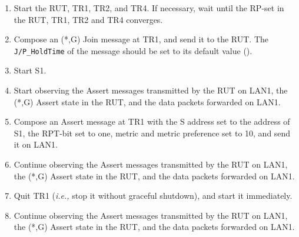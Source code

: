 \documentclass[11pt]{report}
\newcommand{\ie}{\emph{i.e.,}\xspace}
\begin{document}
\begin{enumerate}

  \item Start the RUT, TR1, TR2, and TR4. If necessary, wait until the RP-set
  in the RUT, TR1, TR2 and TR4 converges.

  \item Compose an (*,G) Join message at TR1, and send it to the RUT.
  The \verb=J/P_HoldTime= of the message should be set to its default
  value ({\PimsmJPHoldTime}).

  \item Start S1.

  \item Start observing the Assert messages transmitted by the RUT on
  LAN1, the (*,G) Assert state in the RUT, and the data packets forwarded on
  LAN1.

  \item Compose an Assert message at TR1 with the S address set to the
  address of S1, the RPT-bit set to one, metric and metric preference set to
  10, and send it on LAN1.

  \item Continue observing the Assert messages transmitted by the RUT on
  LAN1, the (*,G) Assert state in the RUT, and the data packets forwarded on
  LAN1.

  \item Quit TR1 (\ie stop it without graceful shutdown), and start it
  immediately.

  \item Continue observing the Assert messages transmitted by the RUT on
  LAN1, the (*,G) Assert state in the RUT, and the data packets forwarded on
  LAN1.

\end{enumerate}

\end{document}
